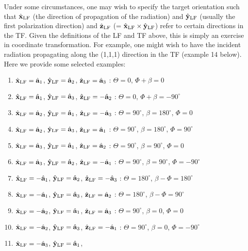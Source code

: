Under some circumstances, one may wish to specify the target
orientation such that $\hat{\bf x}_{\rm LF}$ (the direction of propagation of
the radiation) and $\hat{\bf y}_{\rm LF}$ (usually the first polarization
direction) and $\hat{\bf z}_{\rm LF}$ (= $\hat{\bf x}_{\rm LF} \times \hat{\bf y}_{\rm LF}$) 
refer to certain directions in the TF.  Given the definitions of
the LF and TF above, this is simply an exercise in coordinate
transformation.  For example, one might wish to have the incident
radiation propagating along the (1,1,1) direction in the TF (example
14 below).  Here we provide some selected examples:
\begin{enumerate}
\item$\hat{\bf x}_{\rm LF}= {\hat{\bf a}}_1$, 
     $\hat{\bf y}_{\rm LF}= {\hat{\bf a}}_2$, 
     $\hat{\bf z}_{\rm LF}= {\hat{\bf a}}_3$ : 
	$\Theta=  0$, $\Phi+\beta= 0$
\item$\hat{\bf x}_{\rm LF}= {\hat{\bf a}}_1$, 
     $\hat{\bf y}_{\rm LF}= {\hat{\bf a}}_3$, 
     $\hat{\bf z}_{\rm LF}=-{\hat{\bf a}}_2$ : 
	$\Theta=  0$, $\Phi+\beta= -90^\circ$
\item$\hat{\bf x}_{\rm LF}= {\hat{\bf a}}_2$, 
     $\hat{\bf y}_{\rm LF}= {\hat{\bf a}}_1$, 
     $\hat{\bf z}_{\rm LF}=-{\hat{\bf a}}_3$ : 
	$\Theta= 90^\circ$, $\beta=180^\circ$, $\Phi=  0$
\item$\hat{\bf x}_{\rm LF}= {\hat{\bf a}}_2$, 
     $\hat{\bf y}_{\rm LF}= {\hat{\bf a}}_3$, 
     $\hat{\bf z}_{\rm LF}= {\hat{\bf a}}_1$ : 
	$\Theta= 90^\circ$, $\beta=180^\circ$, $\Phi= 90^\circ$
\item$\hat{\bf x}_{\rm LF}= {\hat{\bf a}}_3$, 
     $\hat{\bf y}_{\rm LF}= {\hat{\bf a}}_1$, 
     $\hat{\bf z}_{\rm LF}= {\hat{\bf a}}_2$ : 
	$\Theta= 90^\circ$, $\beta=90^\circ$, $\Phi=  0$
\item$\hat{\bf x}_{\rm LF}= {\hat{\bf a}}_3$, 
     $\hat{\bf y}_{\rm LF}= {\hat{\bf a}}_2$, 
     $\hat{\bf z}_{\rm LF}=-{\hat{\bf a}}_1$ : 
	$\Theta= 90^\circ$, $\beta=90^\circ$, $\Phi=-90^\circ$
\item$\hat{\bf x}_{\rm LF}=-{\hat{\bf a}}_1$, 
     $\hat{\bf y}_{\rm LF}= {\hat{\bf a}}_2$, 
     $\hat{\bf z}_{\rm LF}=-{\hat{\bf a}}_3$ : 
	$\Theta=180^\circ$, $\beta-\Phi=180^\circ$
\item$\hat{\bf x}_{\rm LF}=-{\hat{\bf a}}_1$, 
     $\hat{\bf y}_{\rm LF}= {\hat{\bf a}}_3$, 
     $\hat{\bf z}_{\rm LF}= {\hat{\bf a}}_2$ : 
	$\Theta=180^\circ$, $\beta-\Phi= 90^\circ$
\item$\hat{\bf x}_{\rm LF}=-{\hat{\bf a}}_2$, 
     $\hat{\bf y}_{\rm LF}= {\hat{\bf a}}_1$, 
     $\hat{\bf z}_{\rm LF}= {\hat{\bf a}}_3$ : 
	$\Theta= 90^\circ$, $\beta=  0$, $\Phi=  0$
\item$\hat{\bf x}_{\rm LF}=-{\hat{\bf a}}_2$, 
     $\hat{\bf y}_{\rm LF}= {\hat{\bf a}}_3$, 
     $\hat{\bf z}_{\rm LF}=-{\hat{\bf a}}_1$ : 
	$\Theta= 90^\circ$, $\beta=  0$, $\Phi=-90^\circ$
\item$\hat{\bf x}_{\rm LF}=-{\hat{\bf a}}_3$, 
     $\hat{\bf y}_{\rm LF}= {\hat{\bf a}}_1$, 

\end{enumerate}

